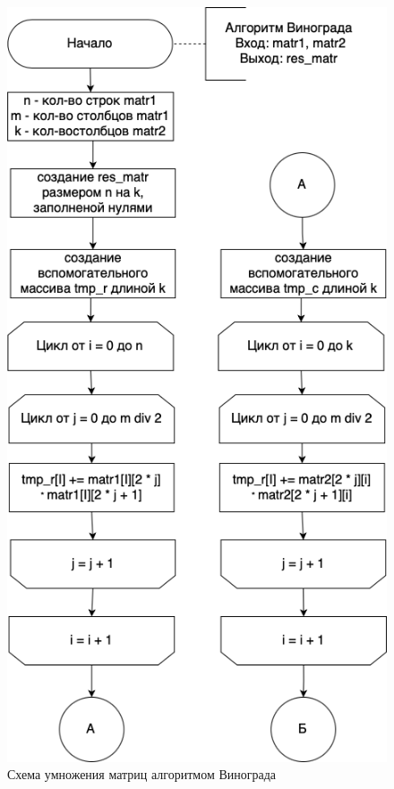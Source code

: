 \documentclass[a4paper,14pt, unknownkeysallowed]{extreport}
\begin{document}
\begin{figure}[h]
	\centering
	\includegraphics[scale=0.7]{img/winograd_alg_scheme1.png}
	\caption{Схема умножения матриц алгоритмом Винограда}
	\label{fig:winograd1}
\end{figure}
 
\clearpage
\end{document}
